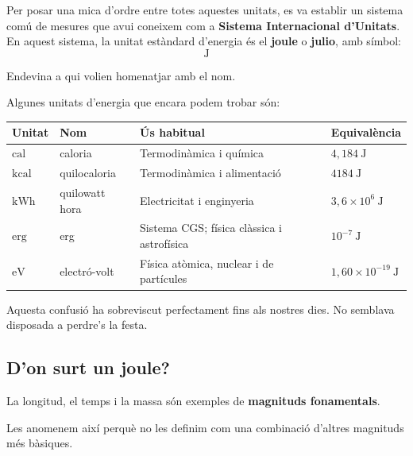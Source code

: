 Per posar una mica d’ordre entre totes aquestes unitats, es va establir un sistema comú de mesures que avui coneixem com a \textbf{Sistema Internacional d’Unitats}. En aquest sistema, la unitat estàndard d’energia és el \textbf{joule} o \textbf{julio}, amb símbol:
\[
\mathrm{J}
\]

Endevina a qui volien homenatjar amb el nom.

Algunes unitats d'energia que encara podem trobar són:


\begin{center}
\scriptsize
\renewcommand{\arraystretch}{1.35}
\setlength{\tabcolsep}{3pt}
\begin{tabularx}{\linewidth}{
|>{\centering\arraybackslash}p{0.9cm}
|>{\raggedright\arraybackslash}p{1.45cm}
|>{\raggedright\arraybackslash}X
|>{\centering\arraybackslash}p{1.65cm}|}
\hline
\textbf{Unitat} &
\textbf{Nom} &
\textbf{Ús habitual} &
\textbf{Equivalència} \\
\hline

$\mathrm{cal}$ &
caloria &
Termodinàmica i química &
$4{,}184\ \mathrm{J}$ \\
\hline

$\mathrm{kcal}$ &
quilocaloria &
Termodinàmica i alimentació &
$4184\ \mathrm{J}$ \\
\hline

$\mathrm{kWh}$ &
quilowatt hora &
Electricitat i enginyeria &
$3{,}6\times10^{6}\ \mathrm{J}$ \\
\hline

$\mathrm{erg}$ &
erg &
Sistema CGS; física clàssica i astrofísica &
$10^{-7}\ \mathrm{J}$ \\
\hline

$\mathrm{eV}$ &
electró-volt &
Física atòmica, nuclear i de partícules &
$1{,}60\times10^{-19}\ \mathrm{J}$ \\
\hline

\end{tabularx}
\end{center}

Aquesta confusió ha sobreviscut perfectament fins als nostres dies. No semblava disposada a perdre's la festa.

\subsection{D'on surt un joule?}

La longitud, el temps i la massa són exemples de \textbf{magnituds fonamentals}.

Les anomenem així perquè no les definim com una combinació d'altres magnituds més bàsiques.

